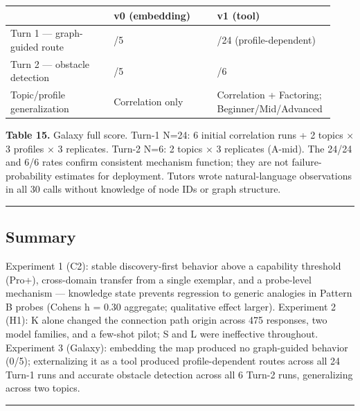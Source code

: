 \documentclass[
]{article}
\newcounter{none} %
\begin{document}
{\def\LTcaptype{none} %
\begin{longtable}[]{@{}>{\raggedright\arraybackslash}p{0.310\linewidth}>{\raggedright\arraybackslash}p{0.310\linewidth}>{\raggedright\arraybackslash}p{0.310\linewidth}@{}}
\toprule\noalign{}
& v0 (embedding) & v1 (tool) \\
\midrule\noalign{}
\endhead
\bottomrule\noalign{}
\endlastfoot
Turn 1 --- graph-guided route & 0/5 & 24/24 (profile-dependent) \\
Turn 2 --- obstacle detection & 0/5 & 6/6 \\
Topic/profile generalization & Correlation only & Correlation + Factoring; Beginner/Mid/Advanced \\
\end{longtable}
}

\textbf{Table 15.} Galaxy full score. Turn-1 N=24: 6 initial correlation runs + 2 topics × 3 profiles × 3 replicates. Turn-2 N=6: 2 topics × 3 replicates (A-mid). The 24/24 and 6/6 rates confirm consistent mechanism function; they are not failure-probability estimates for deployment. Tutors wrote natural-language observations in all 30 calls without knowledge of node IDs or graph structure.

\begin{center}\rule{0.5\linewidth}{0.5pt}\end{center}

\subsection{Summary}\label{summary-1}

Experiment 1 (C2): stable discovery-first behavior above a capability threshold (Pro+), cross-domain transfer from a single exemplar, and a probe-level mechanism --- knowledge state prevents regression to generic analogies in Pattern B probes (Cohen\textquotesingle s h = 0.30 aggregate; qualitative effect larger). Experiment 2 (H1): K alone changed the connection path origin across 475 responses, two model families, and a few-shot pilot; S and L were ineffective throughout. Experiment 3 (Galaxy): embedding the map produced no graph-guided behavior (0/5); externalizing it as a tool produced profile-dependent routes across all 24 Turn-1 runs and accurate obstacle detection across all 6 Turn-2 runs, generalizing across two topics.

\begin{center}\rule{0.5\linewidth}{0.5pt}\end{center}
\end{document}
